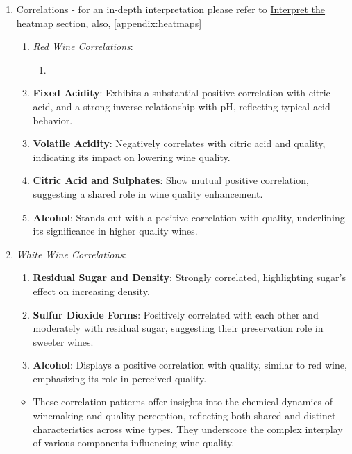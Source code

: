 \documentclass{article}
\begin{document}
\begin{enumerate}
    \item Correlations - for an in-depth interpretation please refer to \href{https://github.com/hjoaquim/applied-ai/blob/main/wine-analysis/exploratory-analysis.ipynb}{Interpret the heatmap} section, also, \ref{appendix:heatmaps}
        \begin{enumerate}
            \item \textit{Red Wine Correlations}:
            \begin{enumerate}
                \item
            \end{enumerate}
                \item \textbf{Fixed Acidity}: Exhibits a substantial positive correlation with citric acid, and a strong inverse relationship with pH, reflecting typical acid behavior.
                \item \textbf{Volatile Acidity}: Negatively correlates with citric acid and quality, indicating its impact on lowering wine quality.
                \item \textbf{Citric Acid and Sulphates}: Show mutual positive correlation, suggesting a shared role in wine quality enhancement.
                \item \textbf{Alcohol}: Stands out with a positive correlation with quality, underlining its significance in higher quality wines.
            \end{enumerate}
            \item \textit{White Wine Correlations}:
            \begin{enumerate}
                \item \textbf{Residual Sugar and Density}: Strongly correlated, highlighting sugar's effect on increasing density.
                \item \textbf{Sulfur Dioxide Forms}: Positively correlated with each other and moderately with residual sugar, suggesting their preservation role in sweeter wines.
                \item \textbf{Alcohol}: Displays a positive correlation with quality, similar to red wine, emphasizing its role in perceived quality.
            \end{enumerate}
            \begin{itemize}
                \item These correlation patterns offer insights into the chemical dynamics of winemaking and quality perception, reflecting both shared and distinct characteristics across wine types. They underscore the complex interplay of various components influencing wine quality.
            \end{itemize}


\end{enumerate}
\end{document}
